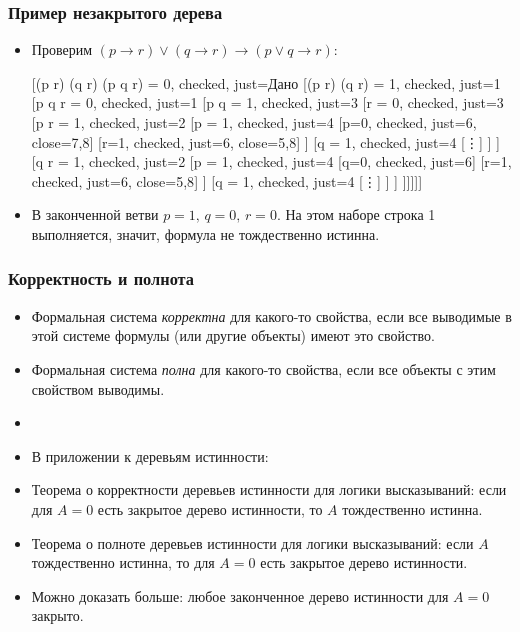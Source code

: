 \documentclass[10pt]{beamer}
\begin{document}
\begin{frame}
\frametitle{Пример незакрытого дерева}
\begin{itemize}
    \item Проверим $(p \to r) \lor (q \to r) \to (p \lor q \to r)$:
    \begin{tableau}{}
        [{(p \to r) \lor (q \to r) \to (p \lor q \to r) = 0}, checked, just=Дано
        [{(p \to r) \lor (q \to r) = 1}, checked, just=1
        [{p \lor q \to r = 0}, checked, just=1
        [{p \lor q = 1}, checked, just=3
        [{r = 0}, checked, just=3
        [{p \to r = 1}, checked, just=2
        [{p = 1}, checked, just=4
        [{p=0}, checked, just=6, close={7,8}]
        [{r=1}, checked, just=6, close={5,8}]
        ]
        [{q = 1}, checked, just=4
        [\vdots]
        ]
        ]
        [{q \to r = 1}, checked, just=2
        [{p = 1}, checked, just=4
        [{q=0}, checked, just=6]
        [{r=1}, checked, just=6, close={5,8}]
        ]
        [{q = 1}, checked, just=4
        [\vdots]
        ]
        ]
        ]]]]]
    \end{tableau}
    \item В законченной ветви $p=1,\,q=0,\,r=0$. На этом наборе строка 1 выполняется, значит, \pause формула не тождественно истинна.
\end{itemize}
\end{frame}

\begin{frame}
    \frametitle{Корректность и полнота}
    \begin{itemize}
        \item Формальная система \emph{корректна} для какого-то свойства, если все выводимые в этой системе формулы (или другие объекты) имеют это свойство.
        \item Формальная система \emph{полна} для какого-то свойства, если все объекты с этим свойством выводимы.
        \pause
        \item[]
        \item В приложении к деревьям истинности:
        \item Теорема о корректности деревьев истинности для логики высказываний: если для $A=0$ есть закрытое дерево истинности, то $A$ тождественно истинна.
        \item Теорема о полноте деревьев истинности для логики высказываний: если $A$ тождественно истинна, то для $A=0$ есть закрытое дерево истинности.
        \item Можно доказать больше: любое законченное дерево истинности для $A=0$ закрыто.
    \end{itemize}
\end{frame}
\end{document}
